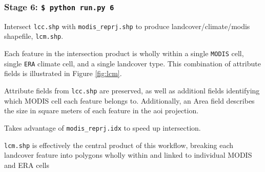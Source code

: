 \documentclass[twoside,a4paper]{refart}
\begin{document}
\subsubsection{\textbf{Stage 6:} \texttt{\$ python run.py 6}}
        Intersect \texttt{lcc.shp} with \texttt{modis\_reprj.shp} to produce landcover/climate/modis shapefile, \texttt{lcm.shp}. 
        
        Each feature in the intersection product is wholly within a single \texttt{MODIS} cell, single \texttt{ERA} climate cell, and a single landcover type. This combination of attribute fields is illustrated in Figure \ref{fig:lcm}.
          
Attribute fields from \texttt{lcc.shp} are preserved, as well as additionl fields identifying which MODIS cell each feature belongs to.  Additionally, an Area field describes the size in square meters of each feature in the aoi projection.
          
Takes advantage of \texttt{modis\_reprj.idx} to speed up intersection.
        
        \texttt{lcm.shp} is effectively the central product of this workflow,
          breaking each landcover feature into polygons wholly within and
          linked to individual MODIS and ERA cells
\end{document}
